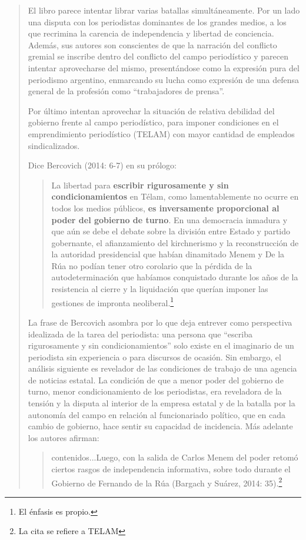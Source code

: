 \begin{quote}
El libro parece intentar librar varias batallas simultáneamente. Por un lado una disputa con los periodistas dominantes de los grandes medios, a los que recrimina la carencia de independencia y libertad de conciencia. Además, sus autores son conscientes de que la narración del conflicto gremial se inscribe dentro del conflicto del campo periodístico y parecen intentar aprovecharse del mismo, presentándose como la expresión pura del periodismo argentino, enmarcando su lucha como expresión de una defensa general de la profesión como \enquote{trabajadores de prensa}.

Por último intentan aprovechar la situación de relativa debilidad del gobierno frente al campo periodístico, para imponer condiciones en el emprendimiento periodístico (TELAM) con mayor cantidad de empleados sindicalizados.

Dice Bercovich (2014: 6-7) en su prólogo:

\begin{quote}
	La libertad para \textbf{escribir rigurosamente y sin condicionamientos} en Télam, como lamentablemente no ocurre en todos los medios públicos, \textbf{es inversamente proporcional al poder del gobierno de turno}. En una democracia inmadura y que aún se debe el debate sobre la división entre Estado y partido gobernante, el afianzamiento del kirchnerismo y la reconstrucción de la autoridad presidencial que habían dinamitado Menem y De la Rúa no podían tener otro corolario que la pérdida de la autodeterminación que habíamos conquistado durante los años de la resistencia al cierre y la liquidación que querían imponer las gestiones de impronta neoliberal.\footnote{El énfasis es propio.}
\end{quote}


La frase de Bercovich asombra por lo que deja entrever como perspectiva idealizada de la tarea del periodista: una persona que \enquote{escriba rigurosamente y sin condicionamientos} solo existe en el imaginario de un periodista sin experiencia o para discursos de ocasión. Sin embargo, el análisis siguiente es revelador de las condiciones de trabajo de una agencia de noticias estatal. La condición de que a menor poder del gobierno de turno, menor condicionamiento de los periodistas, era reveladora de la tensión y la disputa al interior de la empresa estatal y de la batalla por la autonomía del campo en relación al funcionariado político, que en cada cambio de gobierno, hace sentir su capacidad de incidencia. Más adelante los autores afirman:

\begin{quote}
	contenidos...Luego, con la salida de Carlos Menem del poder retomó ciertos rasgos de independencia informativa, sobre todo durante el Gobierno de Fernando de la Rúa (Bargach y Suárez, 2014: 35).\footnote{La cita se refiere a TELAM}
\end{quote}



\end{quote}
